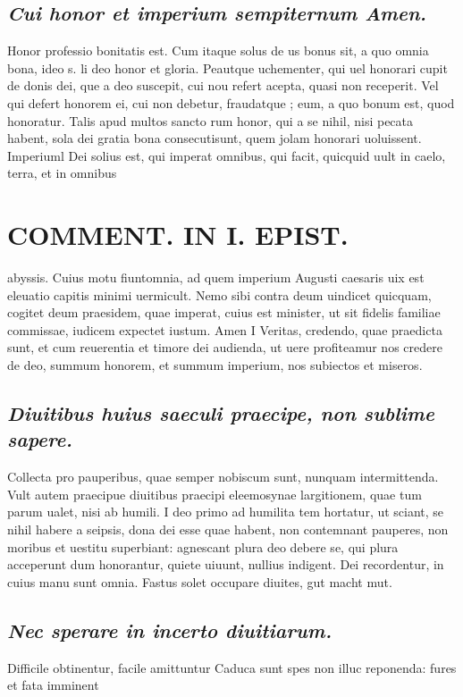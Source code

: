 \documentclass{article}
\begin{document}
\begin{pages}
\subsection*{\textit{Cui honor et imperium sempiternum Amen. }}\pstart Honor professio bonitatis est. Cum itaque solus de us bonus sit, a quo omnia bona, ideo s. li deo honor et gloria. Peautque uchementer, qui uel honorari cupit de donis dei, que a deo suscepit, cui nou refert acepta, quasi non receperit. Vel qui defert honorem ei, cui non debetur, fraudatque ; eum, a quo bonum est, quod honoratur. Talis apud multos sancto rum honor, qui a se nihil, nisi pecata habent, sola dei gratia bona consecutisunt, quem jolam honorari uoluissent.  \pend\pstart Imperiuml Dei solius est, qui imperat omnibus, qui facit, quicquid uult in caelo, terra, et in omnibus  \pend
\section*{COMMENT. IN I. EPIST. }
\marginpar{[ p.180 ]}\pstart abyssis. Cuius motu fiuntomnia, ad quem imperium Augusti caesaris uix est eleuatio capitis minimi uermicult. Nemo sibi contra deum uindicet quicquam, cogitet deum praesidem, quae imperat, cuius est minister, ut sit fidelis familiae commissae, iudicem expectet iustum.  \pend\pstart Amen I Veritas, credendo, quae praedicta sunt, et cum reuerentia et timore dei audienda, ut uere profiteamur nos credere de deo, summum honorem, et summum imperium, nos subiectos et miseros.  \pend
{}
{}
\subsection*{\textit{Diuitibus huius saeculi praecipe, non sublime sapere. }}\pstart Collecta pro pauperibus, quae semper nobiscum sunt, nunquam intermittenda. Vult autem praecipue diuitibus praecipi eleemosynae largitionem, quae tum parum ualet, nisi ab humili. I deo primo ad humilita tem hortatur, ut sciant, se nihil habere a seipsis, dona dei esse quae habent, non contemnant pauperes, non moribus et uestitu superbiant: agnescant plura deo debere se, qui plura acceperunt dum honorantur, quiete uiuunt, nullius indigent. Dei recordentur, in cuius manu sunt omnia. Fastus solet occupare diuites, gut macht mut.  \pend
{}
{}
\subsection*{\textit{Nec sperare in incerto diuitiarum. }}\pstart Difficile obtinentur, facile amittuntur Caduca sunt spes non illuc reponenda: fures et fata imminent  \pend

\end{pages}
\end{document}
